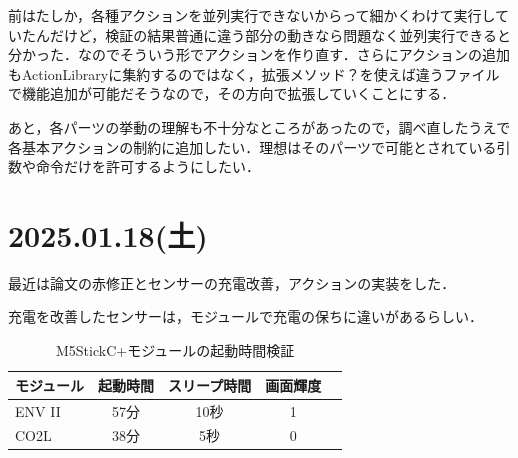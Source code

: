 \documentclass[fleqn,twocolumn]{mynote}
\begin{document}
  前はたしか，各種アクションを並列実行できないからって細かくわけて実行していたんだけど，検証の結果普通に違う部分の動きなら問題なく並列実行できると分かった．なのでそういう形でアクションを作り直す．さらにアクションの追加もActionLibraryに集約するのではなく，拡張メソッド？を使えば違うファイルで機能追加が可能だそうなので，その方向で拡張していくことにする．

  あと，各パーツの挙動の理解も不十分なところがあったので，調べ直したうえで各基本アクションの制約に追加したい．理想はそのパーツで可能とされている引数や命令だけを許可するようにしたい．

  \fboxsep=0pt            %
  \fboxrule=1pt            %
  \begin{figure}[h]
    \centering
    \caption{}
    \label{fig:}
  \end{figure}

  \section*{2025.01.18(土)}
  最近は論文の赤修正とセンサーの充電改善，アクションの実装をした．

  充電を改善したセンサーは，モジュールで充電の保ちに違いがあるらしい．

  \begin{table}[h]
    \caption{M5StickC+モジュールの起動時間検証}
    \label{tab:}
    \centering
    \begin{tabular}{|l|c|c|c|c|}
      \hline
      モジュール & 起動時間 & スリープ時間 & 画面輝度 \\
      \hline
      ENV II & 57分 & 10秒 & 1\\
      CO2L & 38分 & 5秒 & 0\\
      \hline
    \end{tabular}
  \end{table}
\end{document}
